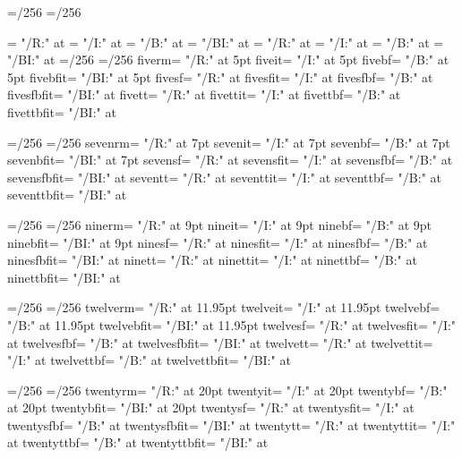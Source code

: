 \def\@sizeat#1{\@tempdimd#1\relax%
  \sf@size=\dimexpr\sf@innerratio\@tempdimd/256\relax
  \tt@size=\dimexpr\tt@innerratio\@tempdimd/256\relax
}
\@sizeat{10pt}
\font\tensf     =  "\sansfontname/R:\textfontopt" at \sf@size
\font\tensfit   =  "\sansfontname/I:\textfontopt" at \sf@size
\font\tensfbf   =  "\sansfontname/B:\textfontopt" at \sf@size
\font\tensfbfit = "\sansfontname/BI:\textfontopt" at \sf@size
\font\tentt     =  "\monofontname/R:\textfontopt" at \tt@size
\font\tenttit   =  "\monofontname/I:\textfontopt" at \tt@size
\font\tenttbf   =  "\monofontname/B:\textfontopt" at \tt@size
\font\tenttbfit = "\monofontname/BI:\textfontopt" at \tt@size
\def\genfontcmds#1#2{\@sizeat{#2}%
  \expandafter\font\csname     #1rm\endcsname =  "\mainfontname/R:\textfontopt" at #2
  \expandafter\font\csname     #1it\endcsname =  "\mainfontname/I:\textfontopt" at #2
  \expandafter\font\csname     #1bf\endcsname =  "\mainfontname/B:\textfontopt" at #2
  \expandafter\font\csname   #1bfit\endcsname = "\mainfontname/BI:\textfontopt" at #2
  \expandafter\font\csname     #1sf\endcsname =  "\sansfontname/R:\textfontopt" at \sf@size
  \expandafter\font\csname   #1sfit\endcsname =  "\sansfontname/I:\textfontopt" at \sf@size
  \expandafter\font\csname   #1sfbf\endcsname =  "\sansfontname/B:\textfontopt" at \sf@size
  \expandafter\font\csname #1sfbfit\endcsname = "\sansfontname/BI:\textfontopt" at \sf@size
  \expandafter\font\csname     #1tt\endcsname =  "\monofontname/R:\textfontopt" at \tt@size
  \expandafter\font\csname   #1ttit\endcsname =  "\monofontname/I:\textfontopt" at \tt@size
  \expandafter\font\csname   #1ttbf\endcsname =  "\monofontname/B:\textfontopt" at \tt@size
  \expandafter\font\csname #1ttbfit\endcsname = "\monofontname/BI:\textfontopt" at \tt@size
}
\genfontcmds{five}{5pt}
\genfontcmds{seven}{7pt}
\genfontcmds{nine}{9pt}
\genfontcmds{twelve}{11.95pt}
\genfontcmds{twenty}{20pt}
\def\makefontcmdcompatible#1{%
  \expandafter\let\csname #1itbf\expandafter\endcsname\csname #1bfit\endcsname
  \expandafter\let\csname #1itsf\expandafter\endcsname\csname #1sfit\endcsname
  \expandafter\let\csname #1bfsf\expandafter\endcsname\csname #1sfbf\endcsname
  \expandafter\let\csname #1sfitbf\expandafter\endcsname\csname #1sfbfit\endcsname
  \expandafter\let\csname #1bfsfit\expandafter\endcsname\csname #1sfbfit\endcsname
  \expandafter\let\csname #1bfitsf\expandafter\endcsname\csname #1sfbfit\endcsname
  \expandafter\let\csname #1itsfbf\expandafter\endcsname\csname #1sfbfit\endcsname
  \expandafter\let\csname #1itbfsf\expandafter\endcsname\csname #1sfbfit\endcsname
  \expandafter\let\csname #1ittt\expandafter\endcsname\csname #1ttit\endcsname
  \expandafter\let\csname #1bftt\expandafter\endcsname\csname #1ttbf\endcsname
  \expandafter\let\csname #1ttitbf\expandafter\endcsname\csname #1ttbfit\endcsname
  \expandafter\let\csname #1bfttit\expandafter\endcsname\csname #1ttbfit\endcsname
  \expandafter\let\csname #1bfittt\expandafter\endcsname\csname #1ttbfit\endcsname
  \expandafter\let\csname #1itttbf\expandafter\endcsname\csname #1ttbfit\endcsname
  \expandafter\let\csname #1itbftt\expandafter\endcsname\csname #1ttbfit\endcsname
}

